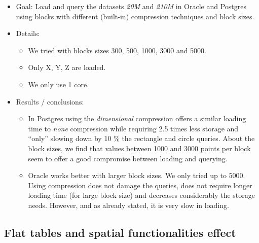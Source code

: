 \documentclass[a4paper,11pt]{article}
\begin{document}
\begin{itemize}
	\item Goal: 	Load and query the datasets \textit{20M} and \textit{210M} in Oracle and Postgres using blocks with different (built-in) compression techniques and block sizes.
	\item Details: 
	\begin{itemize}
		\item We tried with blocks sizes 300, 500, 1000, 3000 and 5000.
		\item Only X, Y, Z are loaded.
		\item We only use 1 core.
	\end{itemize}				
	\item Results / conclusions: 
	\begin{itemize}
		\item In Postgres using the \textit{dimensional} compression offers a similar loading time to \textit{none} compression while requiring 2.5 times less storage and ``only'' slowing down by 10 \% the rectangle and circle queries. About the block sizes, we find that values between 1000 and 3000 points per block seem to offer a good compromise between loading and querying.
		\item Oracle works better with larger block sizes. We only tried up to 5000. Using compression does not damage the queries, does not require longer loading time (for large block size) and decreases considerably the storage needs. However, and as already stated, it is very slow in loading.
	\end{itemize}			
\end{itemize}

\subsection{Flat tables and spatial functionalities effect}
\end{document}
